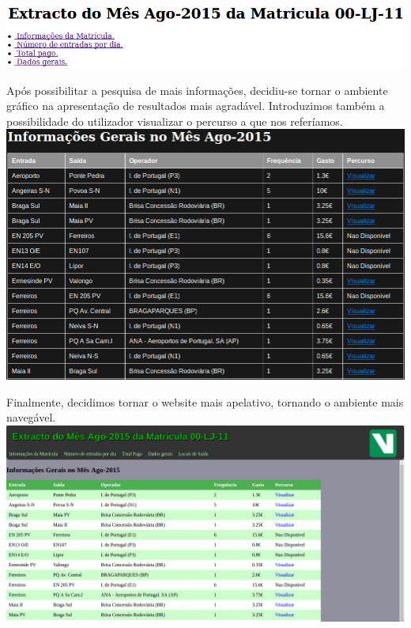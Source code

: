 \documentclass{report}
\begin{document}
\includegraphics[scale=0.4]{htmlV2}
\break
\break
\break
\break

 	Após possibilitar a pesquisa de mais informações, decidiu-se tornar o ambiente gráfico na apresentação de resultados mais agradável. Introduzimos também a possibilidade do utilizador visualizar o percurso a que nos referíamos.\\
 
\includegraphics[scale=0.4]{htmlV3}
\break
\break
\break
\break

	Finalmente, decidimos tornar o website mais apelativo, tornando o ambiente mais navegável.\\

\includegraphics[scale=0.4]{html5}
\end{document}
